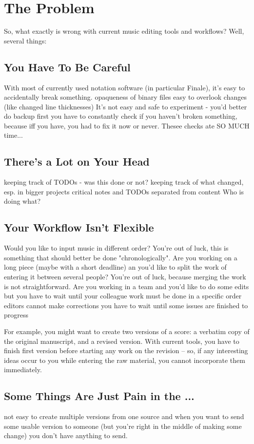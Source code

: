 \documentclass[11pt,a4paper]{article}
\begin{document}
\section{The Problem}
So, what exactly is wrong with current music editing tools and workflows?
Well, several things:

\subsection{You Have To Be Careful}
With most of currently used notation software (in particular Finale), it's easy
to accidentally break something.
opaqueness of binary files
easy to overlook changes (like changed line thicknesses)
It's not easy and safe to experiment - you'd better do backup first
you have to constantly check if you haven't broken something,
because iff you have, you had to fix it now or never.
Thesee checks ate SO MUCH time...

\subsection{There's a Lot on Your Head}
keeping track of TODOs - was this done or not?
keeping track of what changed, esp. in bigger projects
critical notes and TODOs separated from content
Who is doing what?

\subsection{Your Workflow Isn't Flexible}
Would you like to input music in different order?  You're out of luck,
this is something that should better be done "chronologically".
Are you working on a long piece (maybe with a short deadline) an you'd like to split the work
of entering it between several people?  You're out of luck,
because merging the work is not straightforward.
Are you working in a team and you'd like to do some edits but you have to wait
until your colleague
work must be done in a specific order
editors cannot make corrections
you have to wait until some issues are finished to progress

For example, you might want to create two versions of a score:
a verbatim copy of the original manuscript, and a revised version.
With current tools, you have to finish first version before starting
any work on the revision -- so, if any interesting ideas occur to you
while entering the raw material, you cannot incorporate them immediately.

\subsection{Some Things Are Just Pain in the ...}
not easy to create multiple versions from one source
and when you want to send some usable version to someone
(but you're right in the middle of making some change)
you don't have anything to send.
\end{document}
